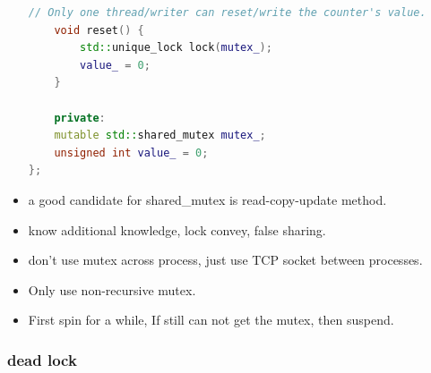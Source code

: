 \documentclass[a4paper,11pt,twoside]{book}
\begin{document}
\begin{itemize}
\begin{lstlisting}[frame=single, language=c++]
	// Only one thread/writer can reset/write the counter's value.
	void reset() {
		std::unique_lock lock(mutex_);
		value_ = 0;
	}
	
	private:
	mutable std::shared_mutex mutex_;
	unsigned int value_ = 0;
};	
\end{lstlisting}

\item a good candidate for shared\_mutex is read-copy-update method. 

\item know additional knowledge, lock convey,  false sharing.

\item don't use mutex across process, just use TCP socket between processes. 

\item Only use non-recursive mutex.

\item First spin for a while, If still can not get the mutex, then suspend.

\end{itemize}

\subsubsection{dead lock}
\end{document}
